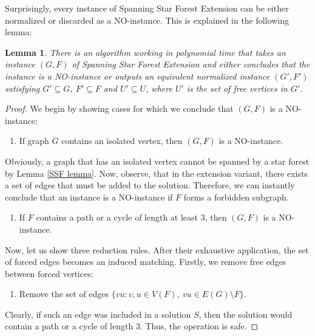 \documentclass[en]{pracamgr}
\newtheorem{lemma}{Lemma}
\theoremstyle{definition}
\newcommand{\ssfep}{{\sc Spanning Star Forest Extension}}
\begin{document}
Surprisingly, every instance of \ssfep{} can be either normalized or discarded as a NO-instance. This is explained in the following lemma:

\begin{lemma}
	There is an algorithm working in polynomial time that takes an instance $(G,F)$ of \ssfep{} and either concludes that the instance is a NO-instance or outputs an equivalent normalized instance $(G',F')$ satisfying $G' \subseteq G$,  $F' \subseteq F$ and $U' \subseteq U$, where $U'$ is the set of free vertices in $G'$.
\end{lemma}

\begin{proof}
	We begin by showing cases for which we conclude that $(G,F)$ is a NO-instance:
	\begin{enumerate}[leftmargin=*,label=\textbf{Reduction \arabic{enumi}},labelindent=0pt]
		\item If graph $G$ contains an isolated vertex, then $(G,F)$ is a NO-instance.
	\end{enumerate}
	
	Obviously, a graph that has an isolated vertex cannot be spanned by a star forest by Lemma \ref{SSF lemma}. Now, observe, that in the extension variant, there exists a set of edges that must be added to the solution. Therefore, we can instantly conclude that an instance is a NO-instance if $F$ forms a forbidden subgraph.
	
	\begin{enumerate}[leftmargin=*,label=\textbf{Reduction \arabic{enumi}},labelindent=0pt,resume]
		\item If $F$ contains a path or a cycle of length at least $3$, then $(G,F)$ is a NO-instance.
	\end{enumerate}
	
	Now, let us show three reduction rules. After their exhaustive application, the set of forced edges becomes an induced matching. Firstly, we remove free edges between forced vertices:	

	\begin{enumerate}[leftmargin=*,label=\textbf{Reduction \arabic{enumi}},labelindent=0pt,resume]
		\item Remove the set of edges $\{vu: v,u \in V(F),\ vu \in E(G) \setminus F\}$.
	\end{enumerate}
	Clearly, if such an edge was included in a solution $S$, then the solution would contain a path or a cycle of length $3$. Thus, the operation is safe. 
	

\end{proof}
\end{document}
